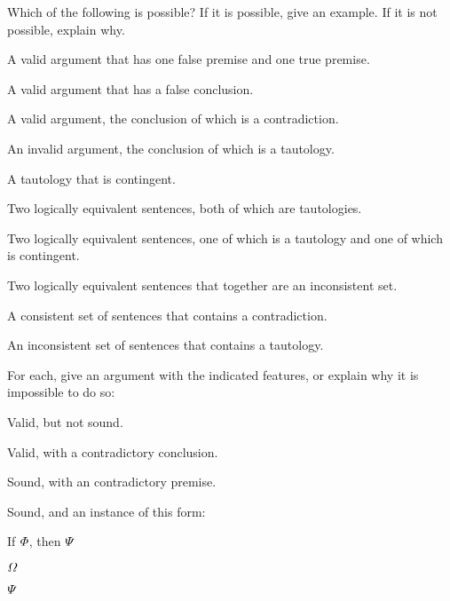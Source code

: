 
\solutions
\problempart
\label{pr.EnglishCombinations}
Which of the following is possible? If it is possible, give an example. If it is not possible, explain why.
\begin{earg}
\item A valid argument that has one false premise and one true premise.
\item A valid argument that has a false conclusion.
\item A valid argument, the conclusion of which is a contradiction.
\item An invalid argument, the conclusion of which is a tautology.
\item A tautology that is contingent.
\item Two logically equivalent sentences, both of which are tautologies.
\item Two logically equivalent sentences, one of which is a tautology and one of which is contingent.
\item Two logically equivalent sentences that together are an inconsistent set.
\item A consistent set of sentences that contains a contradiction.
\item An inconsistent set of sentences that contains a tautology.
\end{earg}


\problempart
\label{hw1.C}
For each, give an argument with the indicated features, or explain why it is impossible to do so:
	\begin{earg}
		\item Valid, but not sound.
		\item Valid, with a contradictory conclusion.
		\item Sound, with an contradictory premise.
		\item Sound, and an instance of this form:
			\begin{earg}
        \item[] If $\varPhi{}$, then $\varPsi{}$
        \item[] $\varOmega{}$
        \item[\therefore] $\varPsi{}$
			\end{earg}
	\end{earg}


